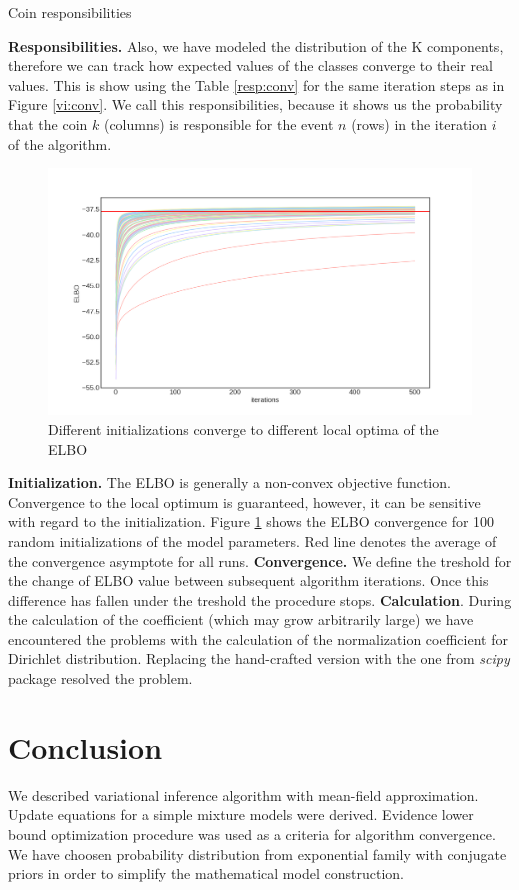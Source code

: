 \documentclass{article}
\begin{document}
\begin{table}
\caption {Coin responsibilities}
\label{resp:conv}
\end{table}
\textbf{Responsibilities.} Also, we have modeled the distribution of the K components, therefore we can track how expected values of the classes converge to their real values. This is show using the Table \ref{resp:conv} for the same iteration steps as in Figure \ref{vi:conv}. We call this responsibilities, because it shows us the probability that the coin $k$ (columns) is responsible for the event $n$ (rows) in the iteration $i$ of the algorithm.
\begin{figure}[H]
\includegraphics[width=\textwidth]{ELBO_Convergence}
\caption{Different initializations converge to different local optima of the ELBO}
\label{elbo:conv}
\end{figure}
\textbf{Initialization.} The ELBO is generally a non-convex objective function. Convergence to the local optimum is guaranteed, however, it can be sensitive with regard to the initialization. Figure \ref{elbo:conv} shows the ELBO convergence for 100 random initializations of the model parameters. Red line denotes the average of the convergence asymptote for all runs. 
\textbf{Convergence.} We define the treshold for the change of ELBO value between subsequent algorithm iterations. Once this difference has fallen under the treshold the procedure stops.
\textbf{Calculation}. During the calculation of the coefficient (which may grow arbitrarily large) we have encountered the problems with the calculation of the normalization coefficient for Dirichlet distribution. Replacing the hand-crafted version with the one from \textit{scipy} package resolved the problem.
\section{Conclusion}
We described variational inference algorithm with mean-field approximation. Update equations for a simple mixture models were derived. Evidence lower bound optimization procedure was used as a criteria for algorithm convergence. We have choosen probability distribution from exponential family with conjugate priors in order to simplify the mathematical model construction.
\end{document}
